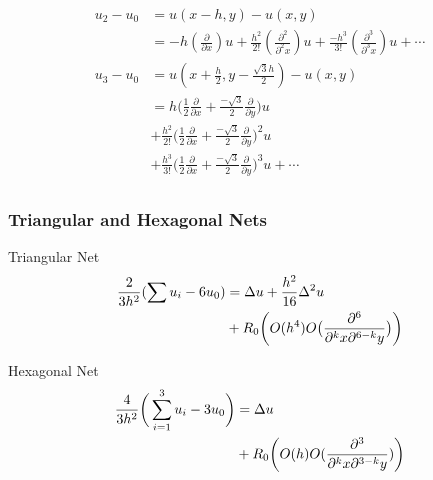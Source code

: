 \documentclass{beamer}
\begin{document}
\begin{frame}
\begin{minipage}{.5\textwidth}
\begin{align*}
u_2 - u_0 &= u(x-h,y) - u(x,y) \\
&= -h (\frac{\partial}{\partial x})u + \frac{h^2}{2!}(\frac{\partial^2 }{\partial^2 x})u + \frac{-h^3}{3!} (\frac{\partial^3}{\partial^3 x})u + \cdots\\
u_3 - u_0 &= u(x+\frac{h}{2},y-\frac{\sqrt{3}h}{2}) - u(x,y) \\
&= h \bigg(\frac{1}{2}\frac{\partial}{\partial x} + \frac{-\sqrt{3}}{2} \frac{\partial}{\partial y} \bigg)u \\
&+ \frac{h^2}{2!}\bigg(\frac{1}{2}\frac{\partial}{\partial x} + \frac{-\sqrt{3}}{2} \frac{\partial}{\partial y} \bigg)^2 u \\
&+ \frac{h^3}{3!} \bigg(\frac{1}{2}\frac{\partial}{\partial x} + \frac{-\sqrt{3}}{2} \frac{\partial}{\partial y} \bigg)^3 u + \cdots\\
\end{align*}
\end{minipage}
\end{frame}


\begin{frame}
\frametitle{Triangular and Hexagonal Nets}
\tiny

\centering
\begin{minipage}{.5\textwidth}
  \centering
Triangular Net
\begin{align}
\frac{2}{3h^2}(\sum u_i - 6 u_0) &= \Delta u + \frac{h^2}{16} \Delta^2 u \notag \\
&+ R_0 \bigg(O(h^4)O\big( \frac{\partial^6}{\partial^k x \partial^{6-k}y}\big)\bigg)
\end{align}
\end{minipage}%
\begin{minipage}{.5\textwidth}
  \centering
Hexagonal Net
\begin{align}
\frac{4}{3h^2} \bigg( \sum_{i=1}^3 u_i - 3 u_0 \bigg) &= \Delta u \notag \\
&+ R_0 \bigg( O(h) O(\frac{\partial^3}{\partial^k x \partial^{3-k} y})\bigg)
\end{align}
\end{minipage}

\end{frame}



\end{document}

